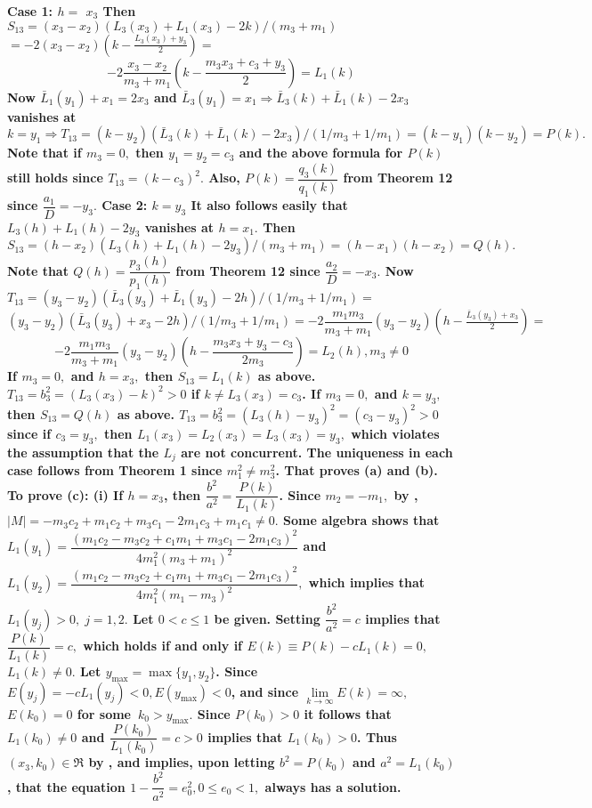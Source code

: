 \bf Case 1: \rm $h=$ $x_{3}$ \nl
Then $S_{13}=(x_{3}-x_{2})(L_{3}(x_{3})+L_{1}(x_{3})-2k)/(m_{3}+m_{1})$ \nl $=-2(x_{3}-x_{2})(k-\frac{L_{3}(x_{3})+y_{3}}{2})=$ $$-2\dfrac{x_{3}-x_{2}}{m_{3}+m_{1}}\left( k-\frac{m_{3}x_{3}+c_{3}+y_{3}}{2}\right) =L_{1}(k)\tag{59}$$ Now $\bar{L}_{1}(y_{1})+x_{1}=2x_{3}$ and $\bar{L}_{3}(y_{1})=x_{1}\Rightarrow \bar{L}_{3}(k)+\bar{L}_{1}(k)-2x_{3}$ vanishes at $k=y_{1}\Rightarrow T_{13}=(k-y_{2})\left( \bar{L}_{3}(k)+\bar{L}_{1}(k)-2x_{3}\right) /\left( 1/m_{3}+1/m_{1}\right) =(k-y_{1})(k-y_{2})=P(k).$ Note that if $m_{3}=0,$ then $y_{1}=y_{2}=c_{3}$ and the above formula for $P(k)$ still holds since $T_{13}=(k-c_{3})^{2}.$ Also, $P(k)=\dfrac{q_{3}(k)}{q_{1}(k)}$ from Theorem 12 since $\dfrac{a_{1}}{D}=\allowbreak -y_{3}.$ \nl
\bf Case 2: \rm $k=y_{3}$ \nl
It also follows easily that $L_{3}(h)+L_{1}(h)-2y_{3}$ vanishes at $h=x_{1}.$ Then $S_{13}=(h-x_{2})\left( L_{3}(h)+L_{1}(h)-2y_{3}\right) /(m_{3}+m_{1})=(h-x_{1})(h-x_{2})=Q(h).$ Note that $Q(h)=\dfrac{p_{3}(h)}{p_{1}(h)}$ from Theorem 12 since $\dfrac{a_{2}}{D}=-x_{3}.$ Now $T_{13}=(y_{3}-y_{2})(\bar{L}_{3}(y_{3})+\bar{L}_{1}(y_{3})-2h)/\left( 1/m_{3}+1/m_{1}\right) =$ $(y_{3}-y_{2})(\bar{L}_{3}(y_{3})+x_{3}-2h)/\left( 1/m_{3}+1/m_{1}\right) =-2\dfrac{m_{1}m_{3}}{m_{3}+m_{1}}(y_{3}-y_{2})(h-\frac{\bar{L}_{3}(y_{3})+x_{3}}{2})=$ 
$$-2\dfrac{m_{1}m_{3}}{m_{3}+m_{1}}(y_{3}-y_{2})\left( h-\dfrac{m_{3}x_{3}+y_{3}-c_{3}}{2m_{3}}\right) =L_{2}(h),m_{3}\neq 0$$ If $m_{3}=0,$ and $h=x_{3},$ then $S_{13}=L_{1}(k)$ as above. $T_{13}=b_{3}^{2}=(L_{3}(x_{3})-k)^{2}>0$ if $k\neq L_{3}(x_{3})=c_{3}$. If $m_{3}=0,$ and $k=y_{3},$ then $S_{13}=Q(h)$ as above. $T_{13}=b_{3}^{2}=(L_{3}(h)-y_{3})^{2}=(c_{3}-y_{3})^{2}>0$ since if $c_{3}=y_{3},$ then $L_{1}(x_{3})=L_{2}(x_{3})=L_{3}(x_{3})=y_{3},$ which violates the assumption that the $L_{j}$ are not concurrent. The uniqueness in each case follows from Theorem 1 since $m_{1}^{2}\neq m_{3}^{2}$. That proves (a) and (b). To prove (c):
(i) If $h=x_{3}$, then $\dfrac{b^{2}}{a^{2}}=\dfrac{P(k)}{L_{1}(k)}$. Since $m_{2}=-m_{1},$ by  , 
$\vert M \vert =-m_{3}c_{2}+m_{1}c_{2}+m_{3}c_{1}-2m_{1}c_{3}+m_{1}c_{1}\neq 0.$ Some algebra shows that $L_{1}(y_{1})=\allowbreak \dfrac{\left( m_{1}c_{2}-m_{3}c_{2}+c_{1}m_{1}+m_{3}c_{1}-2m_{1}c_{3}\right) ^{2}}{4m_{1}^{2}\left( m_{3}+m_{1}\right) ^{2}}$ and $L_{1}(y_{2})=\dfrac{\left( m_{1}c_{2}-m_{3}c_{2}+c_{1}m_{1}+m_{3}c_{1}-2m_{1}c_{3}\right) ^{2}}{4m_{1}^{2}\left( m_{1}-m_{3}\right) ^{2}},$ which implies that $L_{1}(y_{j})>0,\;j=1,2.$ Let $0<c\leq 1$ be given. Setting $\dfrac{b^{2}}{a^{2}}=c$ implies that $\dfrac{P(k)}{L_{1}(k)}=c,$ which holds if and only if $E(k)\equiv P(k)-cL_{1}(k)=0,$ $L_{1}(k)\neq 0.$ Let $y_{\max }=\max \{y_{1},y_{2}\}$. Since $E(y_{j})=-cL_{1}(y_{j})<0,E(y_{\max })<0$, and since $\lim\limits_{k\rightarrow \infty }E(k)=\infty ,$ $E(k_{0})=0$ for some\ $k_{0}>y_{\max }.$ Since $P(k_{0})>0$ it follows that $L_{1}(k_{0})\neq 0$ and $\dfrac{P(k_{0})}{L_{1}(k_{0})}=c>0$ implies that $L_{1}(k_{0})>0$. Thus $(x_{3},k_{0})\in \Re $ by , and implies, upon letting $b^{2}=P(k_{0})$ and $a^{2}=L_{1}(k_{0})$, that the equation $1-\dfrac{b^{2}}{a^{2}}=e_{0}^{2},0\leq e_{0}<1,$ always has a solution. \nl
